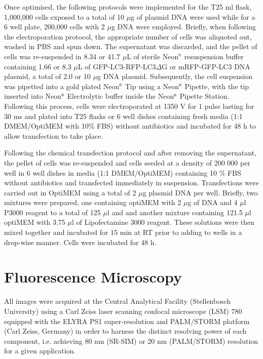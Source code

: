 Once optimised, the following protocols were implemented for the T25 ml flask, 1,000,000 cells exposed to a total of 10 $\mu$g of plasmid DNA were used while for a 6 well plate, 200,000 cells with 2 $\mu$g DNA were employed. Briefly, when following the electroporation protocol, the  appropriate number of cells was aliquoted out, washed in PBS and spun down. The supernatant was discarded, and the pellet of cells was re-suspended in 8.34 or 41.7 $\mu$L of sterile Neon${\textsuperscript{\tiny{\textregistered}}}$ resuspension buffer containing 1.66 or 8.3 $\mu$L of GFP-LC3-RFP-LC3$\Delta$G or mRFP-GFP-LC3 DNA plasmid, a total of 2.0 or 10 $\mu$g DNA plasmid. Subsequently, the cell suspension was pipetted into a gold plated Neon${\textsuperscript{\tiny{\textregistered}}}$ Tip using a Neon${\textsuperscript{\tiny{\textregistered}}}$ Pipette, with the tip inserted into Neon${\textsuperscript{\tiny{\textregistered}}}$ Electrolytic buffer inside the Neon${\textsuperscript{\tiny{\textregistered}}}$ Pipette Station. Following this process, cells were electroporated at 1350 V for 1 pulse lasting for 30 ms and plated into T25 flasks or 6 well dishes containing fresh media (1:1 DMEM/OptiMEM with 10\% FBS) without antibiotics and incubated for 48 h to allow transfection to take place.

Following the chemical transfection protocol and after removing the supernatant, the pellet of cells was re-suspended and cells seeded at a density of 200 000 per well in 6 well dishes in media (1:1 DMEM/OptiMEM) containing 10 \% FBS without antibiotics and transfected immediately in suspension. Transfections were carried out in OptiMEM using a total of 2 $\mu$g plasmid DNA per well. Briefly, two mixtures were prepared, one containing optiMEM with 2 $\mu$g of DNA and 4 $\mu$l P3000 reagent to a total of 125 $\mu$l and and another mixture containing 121.5 $\mu$l optiMEM with 3.75 $\mu$l of Lipofectamine 3000 reagent.  These solutions were then mixed together and incubated for 15 min at RT prior to adding to wells in a drop-wise manner. Cells were incubated for 48 h. 

\section{Fluorescence Microscopy}
All images were acquired at the Central Analytical Facility (Stellenbosch University) using a Carl Zeiss laser scanning confocal microscope (LSM) 780 equipped with the ELYRA PS1 super-resolution and PALM/STORM platform (Carl Zeiss, Germany) in order to harness the distinct resolving power of each component, i.e. achieving 80 nm (SR-SIM) or 20 nm (PALM/STORM) resolution for a given application.

